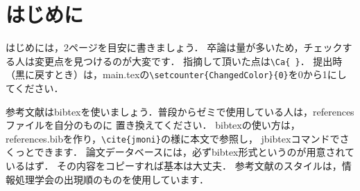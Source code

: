 ﻿\section{はじめに}
はじめには，2ページを目安に書きましょう．
卒論は量が多いため，チェックする人は変更点を見つけるのが大変です．
指摘して頂いた点は\verb|\Ca{ }|．
提出時（黒に戻すとき）は，main.texの\verb|\setcounter{ChangedColor}{0}|を0から1にしてください．

参考文献はbibtexを使いましょう．普段からゼミで使用している人は，referencesファイルを自分のものに
置き換えてください．
bibtexの使い方は，references.bibを作り，\verb|\cite{jmoni}|の様に本文で参照\cite{jmoni}し，
jbibtexコマンドでさくっとできます．
論文データベースには，必ずbibtex形式というのが用意されているはず．
その内容をコピーすれば基本は大丈夫．
参考文献のスタイルは，情報処理学会の出現順のものを使用しています．
